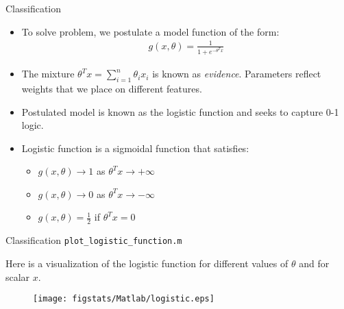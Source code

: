 \documentclass[9pt]{beamer}
\begin{document}
\begin{frame}{Classification}


\begin{itemize}
  \setlength{\itemsep}{10pt}
\item To solve problem, we postulate a model function of the form:
\begin{align*}
g(x,\theta)=\frac{1}{1+e^{-\theta^Tx}}
\end{align*}
 
\item The mixture $\theta^Tx=\sum_{i=1}^n\theta_ix_i$ is known as {\em evidence}. Parameters reflect weights that we place on different features.

\item Postulated model is known as the logistic function and seeks to capture 0-1 logic. 
\item Logistic function is a sigmoidal function that satisfies:

\begin{itemize}
  \setlength{\itemsep}{10pt}
 \item $g(x,\theta)\to 1$ as $\theta^Tx\to +\infty$ 
 \item $g(x,\theta)\to 0$ as $\theta^Tx\to -\infty$ 
 \item $g(x,\theta)=\frac{1}{2}$ if $\theta^Tx=0$
\end{itemize}

\end{itemize}

\end{frame}

%
\begin{frame}{Classification \footnotesize{\texttt{plot\_logistic\_function.m}}}

Here is a visualization of the logistic function for different values of $\theta$ and for scalar $x$. 
\begin{figure}[!htb]
    \centering
	\texttt{[image: figstats/Matlab/logistic.eps]}
\end{figure}
\end{frame}


\end{document}
